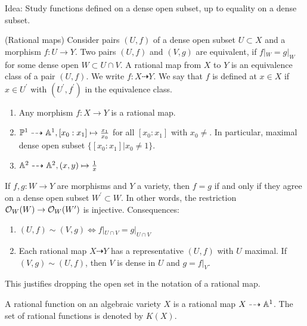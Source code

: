 \documentclass[a4paper,11pt]{article}
\begin{document}
			\noindent Idea: Study functions defined on a dense open subset, up to equality on a dense subset.

			\begin{defi}
				(Rational maps) Consider pairs $(U,f)$ of a dense open subset $U\subset X$ and a morphism $f:U\rightarrow Y$. Two pairs $(U,f)$ and $(V,g)$ are equivalent, if $f|_W=g|_W$ for some dense open $W\subset U\cap V$. A rational map from $X$ to $Y$ is an equivalence class of a pair $(U,f)$. We write $f:X\dashrightarrow Y$. We say that $f$ is defined at $x\in X$ if $x\in U^\prime$ with $(U^\prime,f^\prime)$ in the equivalence class.
			\end{defi}

			\begin{eg}
				\begin{enumerate}
					\item Any morphism $f:X\rightarrow Y$ is a rational map.
					\item $\P^1\dashrightarrow \AA^1, [x_0:x_1]\mapsto\frac{x_1}{x_0}$ for all $[x_0:x_1]$ with $x_0\neq$. In particular, maximal dense open subset $\{[x_0:x_1]|x_0\neq1\}$.
					\item $\AA^2\dashrightarrow\AA^2, (x,y)\mapsto \frac{1}{x}$
				\end{enumerate}
			\end{eg}

			\begin{remark}
				If	$f,g:W\rightarrow Y$ are morphisms and $Y$ a variety, then $f=g$ if and only if they agree on a dense open subset $W^\prime\subset W$. In other words, the restriction $\O_W(W)\rightarrow \O_W(W^\prime)$ is injective. Consequences:
				\begin{enumerate}
					\item $(U,f)\sim(V,g)\Longleftrightarrow f|_{U\cap V}=g|_{U\cap V}$
					\item Each rational map $X\dashrightarrow Y$ has a representative $(U,f)$ with $U$ maximal. If $(V,g)\sim(U,f)$, then $V$ is dense in $U$ and $g=f|_{V}$.	
				\end{enumerate}
				This justifies dropping the open set in the notation of a rational map.
			\end{remark}

			\begin{defi}
				A rational function on an algebraic variety $X$ is a rational map $X\dashrightarrow \AA^1$. The set of rational functions is denoted by $K(X)$.
			\end{defi}
\end{document}
